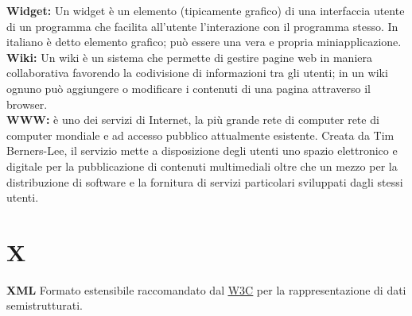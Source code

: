 \hypertarget{widget}{}
\textbf{Widget:}
Un widget \` e un elemento (tipicamente grafico) di una interfaccia utente di un programma che facilita all'utente l'interazione con il programma stesso. In italiano \`  e detto  elemento grafico; pu\` o essere una vera e propria miniapplicazione.\\

\hypertarget{wiki}{}
\textbf{Wiki:}
Un wiki \`e un sistema che permette di gestire pagine web in maniera collaborativa favorendo la codivisione di informazioni tra gli utenti; in un wiki ognuno pu\`o aggiungere o modificare i contenuti di una pagina attraverso il browser.\\

\hypertarget{www}{}
\textbf{WWW:}
\`e uno dei servizi di Internet, la pi\`u grande rete di computer rete di computer mondiale e ad accesso pubblico attualmente esistente.
Creata da Tim Berners-Lee, il servizio mette a disposizione degli utenti uno spazio elettronico e digitale per la pubblicazione di contenuti multimediali oltre che un mezzo per la distribuzione di software e la fornitura di servizi particolari sviluppati dagli stessi utenti. \\

\section*{X}
\hypertarget{xml}{}
\textbf{XML}
\text Formato estensibile raccomandato dal \hyperlink{w3c}{\underline{W3C}} per la rappresentazione di dati semistrutturati.\\


